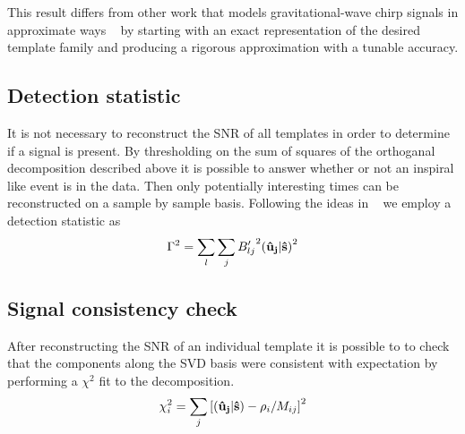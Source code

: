 This result differs from other work that models gravitational-wave chirp
signals in approximate ways 
~\cite{Chassande-Mottin2006, Candes2008, BuonannoChenVallisneri:2003a} 
by starting with an exact representation of the desired template family and
producing a rigorous approximation with a tunable accuracy.  

\subsection{Detection statistic}
It is not necessary to reconstruct the SNR of all templates in order to 
determine if a signal is present.  By thresholding on the sum of squares
of the orthoganal decomposition described above it is possible to answer
whether or not an inspiral like event is in the data.  Then only 
potentially interesting times can be reconstructed on a sample by sample 
basis.  Following the ideas in ~\cite{Anderson:2000yy} we employ a detection
statistic as
\begin{equation}
\label{eq:stat}
\Gamma^2 = \sum_{l} \sum_{j} {B'_{lj}}^2 {({\bf \hat{u}_j}|{\bf \hat{s}})}^2
\end{equation}


\subsection{Signal consistency check}
After reconstructing the SNR of an individual template it is possible to 
to check that the components along the SVD basis were consistent with 
expectation by performing a $\chi^2$ fit to the decomposition.  
\begin{equation}
\label{eq:chisq}
\chi^2_i = \sum_j {[({\bf \hat{u}_j}|{\bf \hat{s}}) - \rho_i / M_{ij}]}^2
\end{equation}


